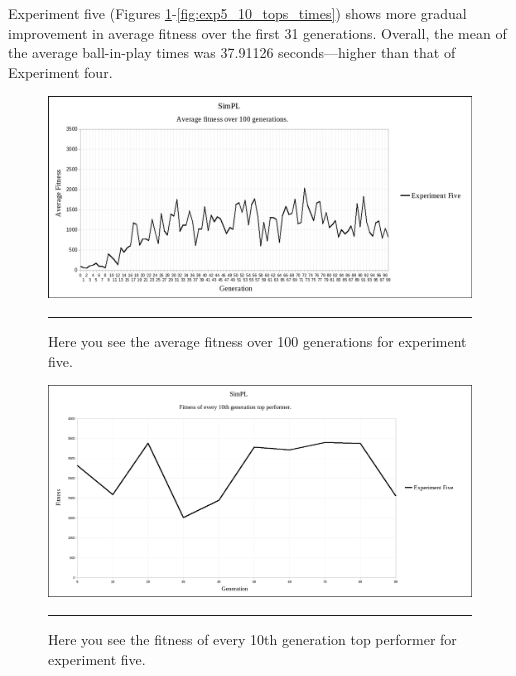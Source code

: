 Experiment five (Figures \ref{fig:exp5_avg_fit}-\ref{fig:exp5_10_tops_times}) shows more gradual improvement in average fitness over the first 31 generations. Overall, the mean of the average ball-in-play times was 37.91126 seconds---higher than that of Experiment four.

\begin{figure}[htbp]  
  \centering
  \includegraphics[width=5in]{../Figures/Chapter3/exp5_avg_fit.png}
  \rule{35em}{0.5pt}
  \caption[Experiment Five Average Fitness]{Here you see the average fitness over 100 generations for experiment five.}
  \label{fig:exp5_avg_fit}
\end{figure}

\begin{figure}[htbp]  
  \centering
  \includegraphics[width=5in]{../Figures/Chapter3/exp5_10_tops.png}
  \rule{35em}{0.5pt}
  \caption[Experiment Five Top Performers]{Here you see the fitness of every 10th generation top performer for experiment five.}
  \label{fig:exp5_10_tops}
\end{figure}

